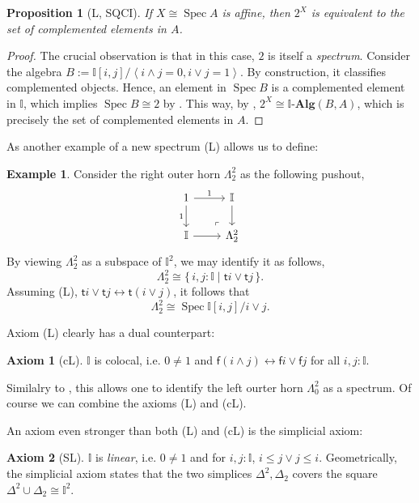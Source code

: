 \documentclass[12pt]{amsart}
\newtheorem{proposition}[theorem]{Proposition}
\theoremstyle{definition}
\newtheorem{example}[theorem]{Example}
\newtheorem*{axiom}{Axiom}
\newcommand{\mb}[1]{\mathbf{#1}}
\newcommand{\mbb}[1]{\mathbb{#1}}
\newcommand{\I}{\mbb I}
\newcommand{\ms}[1]{\mathsf{#1}}
\newcommand{\alg}{\text{-}\mb{Alg}}
\newcommand{\pair}[1]{\left\langle#1\right\rangle}
\newcommand{\scomp}[2]{\{\,#1\mid#2\,\}}
\newcommand{\eq}{\leftrightarrow}
\newcommand{\spec}{\operatorname{Spec}}
\begin{document}
\begin{proposition}[L, SQCI]\label{prop:complementinalgebra}
  If $X \cong \spec A$ is affine, then $2^X$ is equivalent to the set of complemented elements in $A$.
\end{proposition}
\begin{proof}
  The crucial observation is that in this case, $2$ is itself a \emph{spectrum}. Consider the algebra $B := \I[i,j]/\pair{i\wedge j =0,i\vee j = 1}$. By construction, it classifies complemented objects. Hence, an element in $\spec B$ is a complemented element in $\I$, which implies $\spec B \cong 2$ by . This way, by , $2^X \cong \I\alg(B,A)$, which is precisely the set of complemented elements in $A$.
\end{proof}

As another example of a new spectrum (L) allows us to define:

\begin{example}\label{exm:hornaffine}
  Consider the right outer horn $\Lambda^2_2$ as the following pushout,
  \[
    \begin{tikzcd}
      1 \ar[d, "1"'] \ar[r, "1"] & \I \ar[d] \\
      \I \ar[r] & \Lambda^2_2
      \arrow["\lrcorner"{anchor=center, pos=0.125, rotate=180}, draw=none, from=2-2, to=1-1]
    \end{tikzcd}
  \]
  By viewing $\Lambda^2_2$ as a subspace of $\I^2$, we may identify it as follows,
  \[ \Lambda^2_2 \cong \scomp{i,j : \I}{\ms ti \vee \ms tj}. \]
  Assuming (L), $\ms ti \vee \ms tj \eq \ms t(i\vee j)$, it follows that 
  \[ \Lambda^2_2 \cong \spec \I[i,j]/i \vee j. \]
\end{example}

Axiom (L) clearly has a dual counterpart:

\begin{axiom}[cL]\label{ax:cL}
  $\I$ is colocal, i.e. $0 \neq 1$ and $\ms f(i \wedge j) \eq \ms fi \vee \ms fj$ for all $i,j : \I$.
\end{axiom}

Similalry to , this allows one to identify the left ourter horn $\Lambda^2_0$ as a spectrum. Of course we can combine the axioms (L) and (cL). 

An axiom even stronger than both (L) and (cL) is the simplicial axiom:

\begin{axiom}[SL]\label{ax:SL}
  $\I$ is \emph{linear}, i.e. $0 \neq 1$ and for $i,j : \I$, $i \le j \vee j \le i$. Geometrically, the simplicial axiom states that the two simplices $\Delta^2,\Delta_2$ covers the square $\Delta^2 \cup \Delta_2 \cong \I^2$.
\end{axiom}
\end{document}
